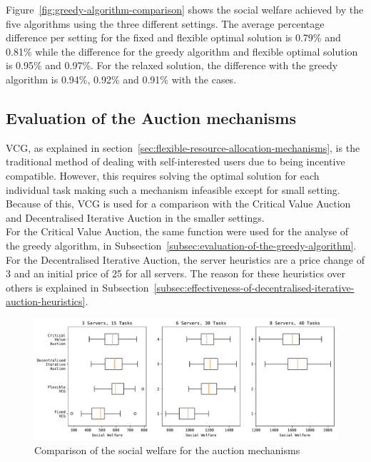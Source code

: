 Figure~\ref{fig:greedy-algorithm-comparison} shows the social welfare achieved by the five algorithms using the
three different settings. The average percentage difference per setting for the fixed and flexible optimal solution is
0.79\% and 0.81\% while the difference for the greedy algorithm and flexible optimal solution is 0.95\% and 0.97\%. For
the relaxed solution, the difference with the greedy algorithm is 0.94\%, 0.92\% and 0.91\% with the cases.

\subsection{Evaluation of the Auction mechanisms}\label{subsec:evaluation-of-the-auction-mechanisms}
VCG, as explained in section~\ref{sec:flexible-resource-allocation-mechanisms}, is the traditional method of dealing
with self-interested users due to being incentive compatible. However, this requires solving the optimal solution
for each individual task making such a mechanism infeasible except for small setting. Because of this, VCG is used for
a comparison with the Critical Value Auction and Decentralised Iterative Auction in the smaller settings. \\
For the Critical Value Auction, the same function were used for the analyse of the greedy algorithm, in
Subsection~\ref{subsec:evaluation-of-the-greedy-algorithm}. For the Decentralised Iterative Auction, the server
heuristics are a price change of 3 and an initial price of 25 for all servers. The reason for these heuristics over
others is explained in Subsection~\ref{subsec:effectiveness-of-decentralised-iterative-auction-heuristics}.

\begin{figure}[h]
    \centering
    \includegraphics[width=\linewidth]{figs/auctions/multi_setting_social_welfare.pdf}
    \caption{Comparison of the social welfare for the auction mechanisms}
    \label{fig:auction-mechanisms-social-welfare}
\end{figure}

